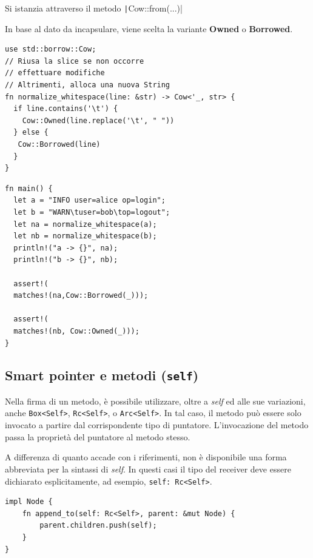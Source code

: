Si istanzia attraverso il metodo \texttt|Cow::from(...)|

In base al dato da incapsulare, viene scelta la variante \textbf{Owned} o \textbf{Borrowed}.


\begin{center}
  \begin{minipage}{0.45\linewidth}
    \begin{verbatim}
use std::borrow::Cow;
// Riusa la slice se non occorre
// effettuare modifiche
// Altrimenti, alloca una nuova String
fn normalize_whitespace(line: &str) -> Cow<'_, str> {
  if line.contains('\t') {
    Cow::Owned(line.replace('\t', " "))
  } else {
   Cow::Borrowed(line)
  }
}
\end{verbatim}
  \end{minipage}%
  \hfill
  \begin{minipage}{0.45\linewidth}
    \begin{verbatim}
fn main() {
  let a = "INFO user=alice op=login";
  let b = "WARN\tuser=bob\top=logout";
  let na = normalize_whitespace(a);
  let nb = normalize_whitespace(b);
  println!("a -> {}", na);
  println!("b -> {}", nb);

  assert!(
  matches!(na,Cow::Borrowed(_)));

  assert!(
  matches!(nb, Cow::Owned(_)));
}
\end{verbatim}
  \end{minipage}
\end{center}

\subsection{Smart pointer e metodi (\texttt{self})}

Nella firma di un metodo, è possibile utilizzare, oltre a \textit{self} ed alle sue
variazioni, anche \verb|Box<Self>|, \verb|Rc<Self>|, o \verb|Arc<Self>|.
In tal caso, il metodo può essere solo invocato a partire dal corrispondente
tipo di puntatore.
L'invocazione del metodo passa la proprietà del puntatore al metodo stesso.

A differenza di quanto accade con i riferimenti, non è disponibile una forma
abbreviata per la sintassi di \textit{self}.
In questi casi il tipo del receiver deve essere dichiarato esplicitamente, ad
esempio, \verb|self: Rc<Self>|.

\begin{verbatim}
impl Node {
    fn append_to(self: Rc<Self>, parent: &mut Node) {
        parent.children.push(self);
    }
}
\end{verbatim}



